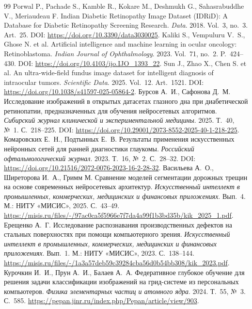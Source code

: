 \documentclass{misisarticle}
\begin{document}
\begin{thebibliography}{99}
 Porwal P., Pachade S., Kamble R., Kokare M., Deshmukh G., Sahasrabuddhe V., Meriaudeau F. Indian Diabetic Retinopathy Image Dataset (IDRiD): A Database for Diabetic Retinopathy Screening Research. \textit{Data}. 2018. Vol.~3, no.~3. Art.~25. DOI: \url{https://doi.org/10.3390/data3030025}.
 Kaliki S., Vempuluru V.~S., Ghose N. et al. Artificial intelligence and machine learning in ocular oncology: Retinoblastoma. \textit{Indian Journal of Ophthalmology}. 2023. Vol.~71, no.~2. P.~424--430. DOI: \url{https://doi.org/10.4103/ijo.IJO_1393_22}.
 Sun J., Zhao X., Chen S. et al. An ultra-wide-field fundus image dataset for intelligent diagnosis of intraocular tumors. \textit{Scientific Data}. 2025. Vol.~12. Art.~1521. DOI: \url{https://doi.org/10.1038/s41597-025-05864-2}.
 Бурсов А.~И., Сафонова Д.~М. Исследование изображений в открытых датасетах глазного дна при диабетической ретинопатии, предназначенных для обучения нейросетевых алгоритмов. \textit{Сибирский журнал клинической и экспериментальной медицины}. 2025. Т.~40, №~1. С.~218--225. DOI: \url{https://doi.org/10.29001/2073-8552-2025-40-1-218-225}.
 Комаровских Е.~Н., Подтынных Е.~В. Результаты применения искусственных нейронных сетей для ранней диагностики глаукомы. \textit{Российский офтальмологический журнал}. 2023. Т.~16, №~2. С.~28--32. DOI: \url{https://doi.org/10.21516/2072-0076-2023-16-2-28-32}.
 Васильева А.~О., Ширеторова И.~А., Гримм М. Сравнение моделей сегментации дорожных трещин на основе современных нейросетевых архитектур. \textit{Искусственный интеллект в промышленных, коммерческих, медицинских и финансовых приложениях}. Вып.~4. М.: НИТУ «МИСИС», 2025. С.~43--49. \url{https://misis.ru/files/-/97ac0ca5f5966e7f7da4a99f1b3bd35b/kik_2025_1.pdf}.
 Ерещенко А.~Г. Исследование распознавания производственных дефектов на стальных поверхностях при помощи компьютерного зрения. \textit{Искусственный интеллект в промышленных, коммерческих, медицинских и финансовых приложениях}. Вып.~1. М.: НИТУ «МИСИС», 2023. С.~138--144. \url{https://misis.ru/files/-/1a3a57deb59c39284cba56d0b54bb308/kik_2023.pdf}.
 Курочкин И.~И., Прун А.~И., Балаев А.~А. Федеративное глубокое обучение для решения задачи классификации изображений на грид-системе из персональных компьютеров. \textit{Физика элементарных частиц и атомного ядра}. 2024. Т.~55, №~3. С.~585. \url{https://pepan.jinr.ru/index.php/Pepan/article/view/903}.

\end{thebibliography}
\end{document}
